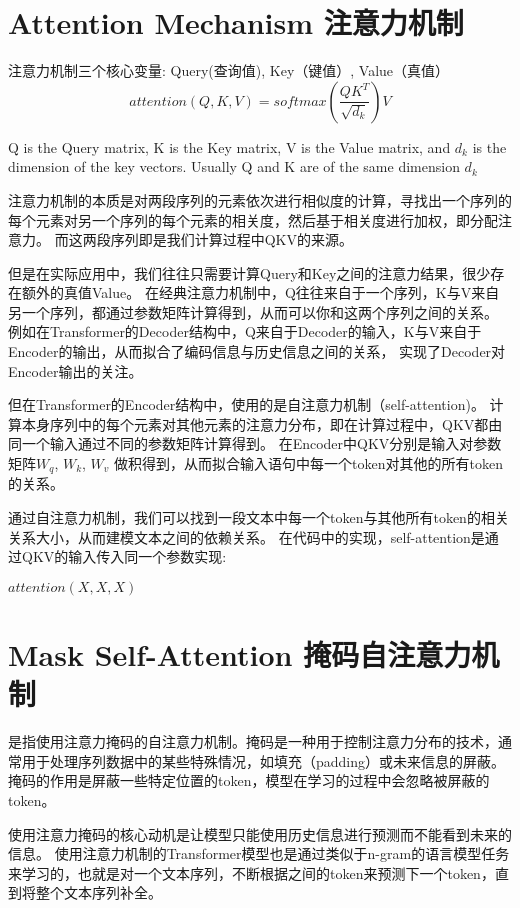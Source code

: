 \documentclass{article}
\begin{document}
\section{Attention Mechanism 注意力机制}

注意力机制三个核心变量: Query(查询值), Key（键值）, Value（真值）
\begin{equation}
    attention(Q,K,V) = softmax(\frac{QK^T}{\sqrt{d_k}})V
    \label{eq:attention}
\end{equation}

Q is the Query matrix, K is the Key matrix, V is the Value matrix, and $d_k$ is the dimension of the key vectors.
Usually Q and K are of the same dimension $d_k$

注意力机制的本质是对两段序列的元素依次进行相似度的计算，寻找出一个序列的每个元素对另一个序列的每个元素的相关度，然后基于相关度进行加权，即分配注意力。
而这两段序列即是我们计算过程中QKV的来源。

但是在实际应用中，我们往往只需要计算Query和Key之间的注意力结果，很少存在额外的真值Value。
在经典注意力机制中，Q往往来自于一个序列，K与V来自另一个序列，都通过参数矩阵计算得到，从而可以你和这两个序列之间的关系。
例如在Transformer的Decoder结构中，Q来自于Decoder的输入，K与V来自于Encoder的输出，从而拟合了编码信息与历史信息之间的关系，
实现了Decoder对Encoder输出的关注。

但在Transformer的Encoder结构中，使用的是自注意力机制（self-attention)。
计算本身序列中的每个元素对其他元素的注意力分布，即在计算过程中，QKV都由同一个输入通过不同的参数矩阵计算得到。
在Encoder中QKV分别是输入对参数矩阵$W_q$, $W_k$, $W_v$ 做积得到，从而拟合输入语句中每一个token对其他的所有token的关系。

通过自注意力机制，我们可以找到一段文本中每一个token与其他所有token的相关关系大小，从而建模文本之间的依赖关系。
在代码中的实现，self-attention是通过QKV的输入传入同一个参数实现:

$attention(X,X,X)$


\section{Mask Self-Attention 掩码自注意力机制}
是指使用注意力掩码的自注意力机制。掩码是一种用于控制注意力分布的技术，通常用于处理序列数据中的某些特殊情况，如填充（padding）或未来信息的屏蔽。
掩码的作用是屏蔽一些特定位置的token，模型在学习的过程中会忽略被屏蔽的token。

使用注意力掩码的核心动机是让模型只能使用历史信息进行预测而不能看到未来的信息。
使用注意力机制的Transformer模型也是通过类似于n-gram的语言模型任务来学习的，也就是对一个文本序列，不断根据之间的token来预测下一个token，直到将整个文本序列补全。
\end{document}
